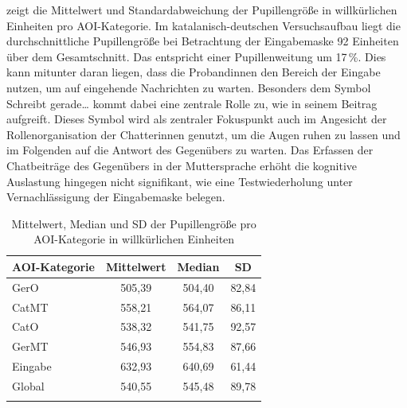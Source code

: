 
 zeigt die Mittelwert und Standardabweichung der Pupillengröße in willkürlichen Einheiten pro AOI-Kategorie. Im katalanisch-deutschen Versuchsaufbau liegt die durchschnittliche Pupillengröße bei Betrachtung der Eingabemaske 92 Einheiten über dem Gesamtschnitt. Das entspricht einer Pupillenweitung um 17\,\%. Dies kann mitunter daran liegen, dass die Proband{\textperiodcentered}innen den Bereich der Eingabe nutzen, um auf eingehende Nachrichten zu warten. Besonders dem Symbol \glqq Schreibt gerade\dots\grqq{} kommt dabei eine zentrale Rolle zu, wie \citet[]{schlosser_beyond_2018} in seinem Beitrag aufgreift. Dieses Symbol wird als zentraler Fokuspunkt auch im Angesicht der Rollenorganisation der Chatter{\textperiodcentered}innen genutzt, um die Augen ruhen zu lassen und im Folgenden auf die Antwort des Gegenübers zu warten. Das Erfassen der Chatbeiträge des Gegenübers in der Muttersprache erhöht die kognitive Auslastung hingegen nicht signifikant, wie eine Testwiederholung unter Vernachlässigung der Eingabemaske belegen.




\begin{table}
   \begin{tabular}{lccc}  
    \lsptoprule
        {AOI-Kategorie} & {Mittelwert} & {Median} & {SD} \\ 
        \midrule
        GerO  & 505,39 & 504,40 & 82,84 \\ 
        CatMT &  558,21 & 564,07 & 86,11 \\ 
        CatO &  538,32 & 541,75 & 92,57 \\ 
        GerMT &  546,93 & 554,83 & 87,66 \\ 
        Eingabe &  632,93 & 640,69 & 61,44 \\ 
        \midrule
        Global  & 540,55 & 545,48 & 89,78 \\ 
        \lspbottomrule
    \end{tabular}
        \caption[Mittelwert, Median und SD der Pupillengröße (AOI)]{Mittelwert, Median und SD der Pupillengröße pro AOI-Kategorie in willkürlichen Einheiten}
    \label{K6:tab:CatDe:mean-sd-psize}
\end{table}


